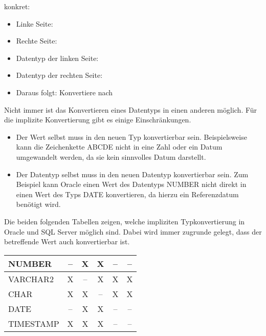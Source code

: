konkret:
\begin{itemize}
    \item Linke Seite: 
    \item Rechte Seite: 
    \item Datentyp der linken Seite: 
    \item Datentyp der rechten Seite: 
    \item Daraus folgt: Konvertiere  nach 
\end{itemize}
Nicht immer ist das Konvertieren eines Datentyps in einen anderen möglich. Für die implizite Konvertierung gibt es einige Einschränkungen.
\begin{itemize}
    \item Der Wert selbst muss in den neuen Typ konvertierbar sein. Beispielsweise kann die Zeichenkette ABCDE nicht in eine Zahl oder ein Datum umgewandelt werden, da sie kein sinnvolles Datum darstellt.
    \item Der Datentyp selbst muss in den neuen Datentyp konvertierbar sein. Zum Beispiel kann Oracle einen Wert des Datentyps NUMBER nicht direkt in einen Wert des Typs DATE konvertieren, da hierzu ein Referenzdatum benötigt wird.
\end{itemize}
Die beiden folgenden Tabellen zeigen, welche impliziten Typkonvertierung in Oracle und SQL Server möglich sind. Dabei wird immer zugrunde gelegt, dass der betreffende Wert auch konvertierbar ist.
\begin{center}
    \label{oracleimplicit}
    \begin{small}
        \tabletail{
            \hline
        }
        \tablelasttail{
            \hline
        }
        \begin{supertabular}{|l|c|c|c|c|c|}
            NUMBER    & -- & X  & X  & -- & -- \\
            \hline
            VARCHAR2  & X  & -- & X  & X  & X \\
            \hline
            CHAR      & X  & X  & -- & X  & X \\
            \hline
            DATE      & -- & X  & X  & -- & -- \\
            \hline
            TIMESTAMP & X  & X  & X  & -- & -- \\
        \end{supertabular}
    \end{small}
\end{center}

